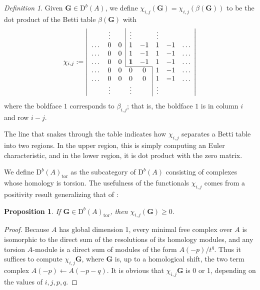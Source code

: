 \documentclass[12pt]{amsart}
\newtheorem{prop}[lemma]{Proposition}
\theoremstyle{definition}
\theoremstyle{remark}
\newtheorem{defn}[lemma]{Definition}
\newcommand{\Gbull}{\mathbf{G}}
\newcommand{\DD}{\mathrm{D}}
\begin{document}
\begin{defn}\label{defn:chi}
Given $\Gbull\in \DD^b(A)$, we define $\chi_{i,j}(\Gbull)=\chi_{i,j}(\beta(\Gbull))$ to be the dot product of the Betti table $\beta(\Gbull)$ with
\begin{equation}\label{eqn:chi}
\chi_{i,j}:=
\left|
\begin{array}{cccccccc}
 & \vdots& &\multicolumn{1}{|c}{\vdots}&& \vdots&&\\
\dots&0&0&\multicolumn{1}{|c}{1}&-1&1&-1&\dots\\
\dots&0&0&\multicolumn{1}{|c}{1}&-1&1&-1&\dots\\
\dots&0&0&\multicolumn{1}{|c}{\mathbf{1}}&-1&1&-1&\dots\\ \cline{4-5}
\dots&0&0&0&0&\multicolumn{1}{|c}{1}&-1&\dots\\
\dots&0&0&0&0&\multicolumn{1}{|c}{1}&-1&\dots\\
& \vdots&&\vdots&& \multicolumn{1}{|c}{\vdots}&&\\
\end{array}
\right|
\end{equation}
where the boldface $1$ corresponds to $\beta_{i,j}$; that is, the boldface $1$ is in column $i$ and row $i-j$. 
\end{defn}
The line that snakes through
the table indicates how $\chi_{i,j}$ separates a Betti table into two regions.  In the upper region, this is simply computing an Euler characteristic, and in the lower region, it is dot product with the zero matrix. 

We define $\DD^b(A)_{\text{tor}}$ as the subcategory of $\DD^b(A)$ consisting of complexes whose homology is torsion.
The usefulness of the functionals $\chi_{i,j}$ comes from a positivity result generalizing that of \cite{eis-schrey1}:

\begin{prop}\label{lem:chi nonneg}
If $\Gbull \in \DD^b(A)_{\text{tor}}$, then $\chi_{i,j}(\Gbull)\geq 0$.
\end{prop}

\begin{proof} Because $A$ has global dimension 1, every minimal free complex
over $A$ is isomorphic to the direct sum of the resolutions of its homology modules, 
and any torsion $A$-module is a direct sum of modules of the form
 $A(-p)/t^q$. Thus it suffices to compute $\chi_{i,j}\Gbull$, where
$
\Gbull
$
is, up to a homological shift, the two term complex
$A(-p)\leftarrow A(-p-q)$.  It is obvious that $\chi_{i,j}\Gbull$ is 0 or 1,
depending on the values of $i,j,p,q$.
\end{proof}
\end{document}
